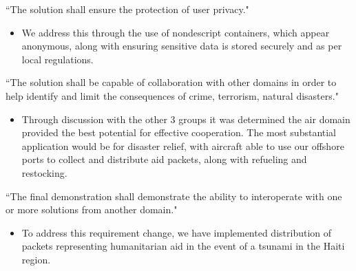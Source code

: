 \begin{description}[style=nextline]
\begin{itemize}
\end{itemize}
\item ``The solution shall ensure the protection of user privacy."
\begin{itemize}
\item We address this through the use of nondescript containers, which appear anonymous, along with ensuring sensitive data is stored securely and as per local regulations.
\end{itemize}
\item ``The solution shall be capable of collaboration with other domains in order to help identify and limit the consequences of crime, terrorism, natural disasters."
\begin{itemize}
\item Through discussion with the other 3 groups it was determined the air domain provided the best potential for effective cooperation. The most substantial application would be for disaster relief, with aircraft able to use our offshore ports to collect and distribute aid packets, along with refueling and restocking.
\end{itemize}
\item ``The final demonstration shall demonstrate the ability to interoperate with one or more solutions from another domain."
\begin{itemize}
\item To address this requirement change, we have implemented distribution of packets representing humanitarian aid in the event of a tsunami in the Haiti region.
\end{itemize}
\end{description}

